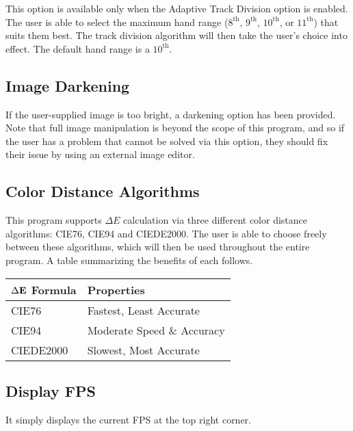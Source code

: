 \documentclass[english]{article}
\makeatletter
\newenvironment{restoretext}%
    {\@parboxrestore%
     \begin{adjustwidth}{}{\leftmargin}%
    }{\end{adjustwidth}
     }
\def\rcbegin{\begin{restoretext}\centering}
\def\rcend{\end{restoretext}}
\makeatother
\begin{document}
This option is available only when the Adaptive Track Division option is enabled. The user is able to select the 
maximum hand range ($8^\text{th}$, $9^\text{th}$, $10^\text{th}$, or $11^\text{th}$) that suits them best. The 
track division algorithm will then take the user's choice into effect. The default hand range is a $10^\text{th}$.

\subsection{Image Darkening}

If the user-supplied image is too bright, a darkening option has been provided. Note that full image manipulation is
beyond the scope of this program, and so if the user has a problem that cannot be solved via this option, they
should fix their issue by using an external image editor.

\subsection{Color Distance Algorithms}

This program supports $\Delta E$ calculation via three different color distance algorithms: CIE76, CIE94 and CIEDE2000.
The user is able to choose freely between these algorithms, which will then be used throughout the entire program.
A table summarizing the benefits of each follows.

\vspace{1em}

\rcbegin
\begin{tabular}{|l|l|}
  \hline
  $\Delta\bf{E}$\textbf{ Formula}   & \textbf{Properties} \\
  \hline
  CIE76                             & Fastest, Least Accurate\\
  CIE94                             & Moderate Speed \& Accuracy\\
  CIEDE2000                         & Slowest, Most Accurate\\
  \hline
\end{tabular}
\rcend

\vspace{1em}

\subsection{Display FPS}

It simply displays the current FPS at the top right corner.
\end{document}
